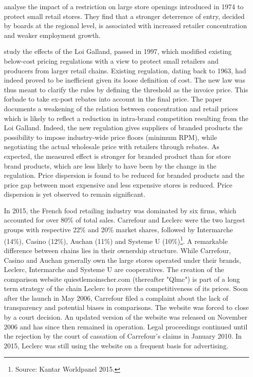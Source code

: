 \documentclass[english]{article}
\begin{document}
\cite{BER02} analyse the impact of a restriction on large store openings introduced in 1974 to protect small retail stores. They find that a stronger deterrence of entry, decided by boards at the regional level, is associated with increased retailer concentration and weaker employment growth.

\cite{BIS13} study the effects of the Loi Galland, passed in 1997, which modified existing below-cost pricing regulations with a view to protect small retailers and producers from larger retail chains. Existing regulation, dating back to 1963, had indeed proved to be inefficient given its loose definition of cost. The new law was thus meant to clarify the rules by defining the threshold as the invoice price. This forbade to take ex-post rebates into account in the final price. The paper documents a weakening of the relation between concentration and retail prices which is likely to reflect a reduction in intra-brand competition resulting from the Loi Galland. Indeed, the new regulation gives suppliers of branded products the possibility to impose industry-wide price floors (minimum RPM), while negotiating the actual wholesale price with retailers through rebates. As expected, the measured effect is stronger for branded product than for store brand products, which are less likely to have been by the change in the regulation. Price dispersion is found to be reduced for branded products and the price gap between most expensive and less expensive stores is reduced. Price dispersion is yet observed to remain significant.

In 2015, the French food retailing industry was dominated by six firms, which accounted for over 80\% of total sales. Carrefour and Leclerc were the two largest groups with respective 22\% and 20\% market shares, followed by Intermarche (14\%), Casino (12\%), Auchan (11\%) and Systeme U (10\%)\footnote{Source: Kantar Worldpanel 2015.}. A remarkable difference between chains lies in their ownership structure. While Carrefour, Casino and Auchan generally own the large stores operated under their brands, Leclerc, Intermarche and Systeme U are cooperatives. The creation of the comparison website quiestlemoinscher.com (thereafter "Qlmc") is part of a long term strategy of the chain Leclerc to prove the competitiveness of its prices. Soon after the launch in May 2006, Carrefour filed a complaint about the lack of transparency and potential biases in comparisons. The website was forced to close by a court decision. An updated version of the website was released on November 2006 and has since then remained in operation. Legal proceedings continued until the rejection by the court of cassation of Carrefour's claims in January 2010. In 2015, Leclerc was still using the website on a frequent basis for advertising.
\end{document}
